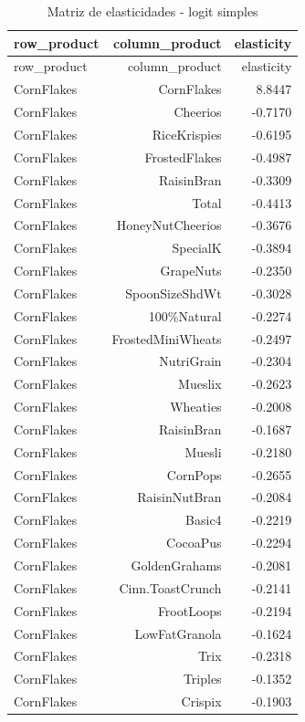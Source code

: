 \begingroup
\scriptsize
\begin{longtable}{@{}lrr@{}}
\caption{Matriz de elasticidades - logit simples}\label{tab:elas-simple}\\
\toprule
row\_product & column\_product & elasticity \\
\midrule
\endfirsthead
\toprule
row\_product & column\_product & elasticity \\
\midrule
\endhead
CornFlakes & CornFlakes & 8.8447 \\
CornFlakes & Cheerios & -0.7170 \\
CornFlakes & RiceKrispies & -0.6195 \\
CornFlakes & FrostedFlakes & -0.4987 \\
CornFlakes & RaisinBran & -0.3309 \\
CornFlakes & Total & -0.4413 \\
CornFlakes & HoneyNutCheerios & -0.3676 \\
CornFlakes & SpecialK & -0.3894 \\
CornFlakes & GrapeNuts & -0.2350 \\
CornFlakes & SpoonSizeShdWt & -0.3028 \\
CornFlakes & 100\%Natural & -0.2274 \\
CornFlakes & FrostedMiniWheats & -0.2497 \\
CornFlakes & NutriGrain & -0.2304 \\
CornFlakes & Mueslix & -0.2623 \\
CornFlakes & Wheaties & -0.2008 \\
CornFlakes & RaisinBran & -0.1687 \\
CornFlakes & Muesli & -0.2180 \\
CornFlakes & CornPops & -0.2655 \\
CornFlakes & RaisinNutBran & -0.2084 \\
CornFlakes & Basic4 & -0.2219 \\
CornFlakes & CocoaPus & -0.2294 \\
CornFlakes & GoldenGrahams & -0.2081 \\
CornFlakes & Cinn.ToastCrunch & -0.2141 \\
CornFlakes & FrootLoops & -0.2194 \\
CornFlakes & LowFatGranola & -0.1624 \\
CornFlakes & Trix & -0.2318 \\
CornFlakes & Triples & -0.1352 \\
CornFlakes & Crispix & -0.1903 \\

\end{longtable}
